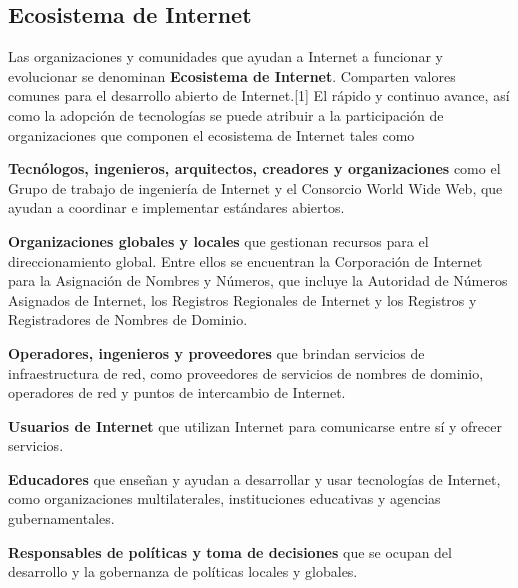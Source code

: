 \documentclass[12pt]{report} %
\begin{document}
\subsection{Ecosistema de Internet}

Las organizaciones y comunidades que ayudan a Internet a funcionar y evolucionar se denominan \textbf{Ecosistema de Internet}. Comparten valores comunes para el desarrollo abierto de Internet.[1] El rápido y continuo avance, así como la adopción de tecnologías se puede atribuir a la participación de organizaciones que componen el ecosistema de Internet tales como


\textbf{Tecnólogos, ingenieros, arquitectos, creadores y organizaciones} como el  Grupo de trabajo de ingeniería de Internet y el  Consorcio World Wide Web, que ayudan a coordinar e implementar estándares abiertos.

\textbf{Organizaciones globales y locales} que gestionan recursos para el direccionamiento global. Entre ellos se encuentran la  Corporación de Internet para la Asignación de Nombres y Números, que incluye la Autoridad de Números Asignados de Internet, los Registros Regionales de Internet y los Registros y Registradores de Nombres de Dominio.

\textbf{ Operadores, ingenieros y proveedores} que brindan servicios de infraestructura de red, como proveedores de servicios de nombres de dominio, operadores de red y puntos de intercambio de Internet.

\textbf{Usuarios de Internet} que utilizan Internet para comunicarse entre sí y ofrecer servicios.

\textbf{Educadores} que enseñan y ayudan a desarrollar y usar tecnologías de Internet, como organizaciones multilaterales, instituciones educativas y agencias gubernamentales.

\textbf{Responsables de políticas y toma de decisiones} que se ocupan del desarrollo y la gobernanza de políticas locales y globales.
\end{document}
